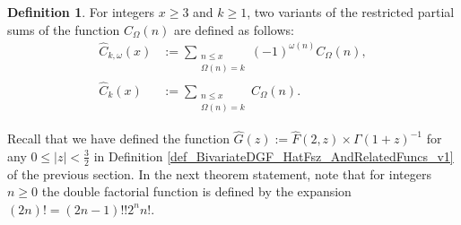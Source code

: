 \documentclass[11pt,reqno,a4letter]{article}
\newcommand{\hlocalref}[1]{\hyperref[#1]{\ref{#1}}}
\numberwithin{equation}{section}
\numberwithin{figure}{section}
\numberwithin{table}{section}
\theoremstyle{plain}
\numberwithin{theorem}{section}
\theoremstyle{definition}
\newtheorem{definition}[theorem]{Definition}
\begin{document}
\begin{definition}
For integers $x \geq 3$ and $k \geq 1$, two variants of the 
restricted partial sums of the function $C_{\Omega}(n)$ are defined as follows: 
\begin{align*} 
\widehat{C}_{k,\omega}(x) & := \sum_{\substack{n \leq x \\ \Omega(n) = k}} 
     (-1)^{\omega(n)} C_{\Omega}(n), \\ 
\widehat{C}_k(x) & := \sum_{\substack{n \leq x \\ \Omega(n) = k}} C_{\Omega}(n). 
\end{align*}
\end{definition}

Recall that we have defined the function 
$\widehat{G}(z) := \widehat{F}(2, z) \times \Gamma(1+z)^{-1}$ for any $0 \leq |z| < \frac{3}{2}$ in 
Definition \hlocalref{def_BivariateDGF_HatFsz_AndRelatedFuncs_v1} 
of the previous section. 
In the next theorem statement, note that for integers $n \geq 0$ the double factorial function 
is defined by the expansion $(2n)! = (2n-1)!! 2^n n!$. 
\end{document}
